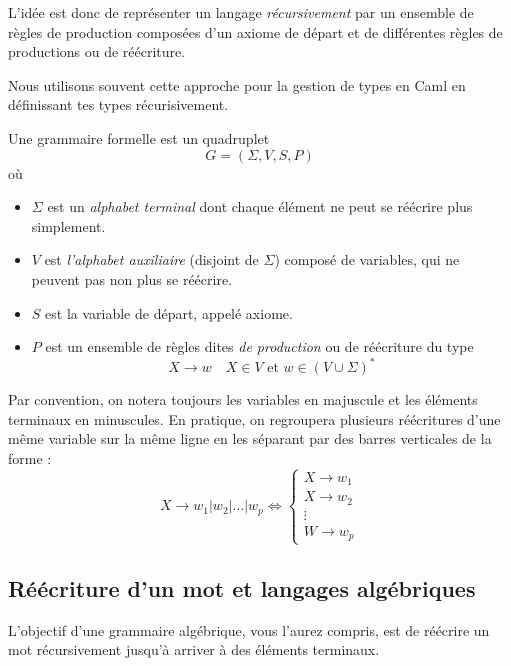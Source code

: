 \vspace{0.3cm}

L'idée est donc de représenter un langage \emph{récursivement} par un ensemble de règles de production composées 
d'un axiome de départ et de différentes règles de productions ou de réécriture. 

Nous utilisons souvent cette approche pour la gestion de types en Caml en définissant tes types récurisivement. 

\begin{definition}
    Une grammaire formelle est un quadruplet 
        \[ G = (\Sigma, V, S, P) \] 
    où 
    \begin{itemize}
        \item $\Sigma$ est un \emph{alphabet terminal} dont chaque élément ne peut se réécrire plus simplement. 
        \item $V$ est \emph{l'alphabet auxiliaire} (disjoint de $\Sigma$) composé de variables, qui ne 
        peuvent pas non plus se réécrire. 
        \item $S$ est la variable de départ, appelé axiome. 
        \item $P$ est un ensemble de règles dites \emph{de production} ou de réécriture du type 
            \[ X \longrightarrow w \quad X \in V \text{ et } w \in \left( V \cup \Sigma \right)^* \] 
    \end{itemize}
\end{definition}

Par convention, on notera toujours les variables en majuscule et les éléments terminaux en minuscules. 
En pratique, on regroupera plusieurs réécritures d'une même variable sur la même ligne en les séparant par 
des barres verticales de la forme :
    \[ X \longrightarrow w_1 | w_2 | \dots | w_p \iff 
        \begin{cases}
            X \longrightarrow w_1 \\ 
            X \longrightarrow w_2 \\ 
            \vdots \\ 
            W \longrightarrow w_p 
        \end{cases}
    \] 


\subsection{Réécriture d'un mot et langages algébriques}

L'objectif d'une grammaire algébrique, vous l'aurez compris, est de réécrire un mot récursivement jusqu'à arriver à des 
éléments terminaux. 

